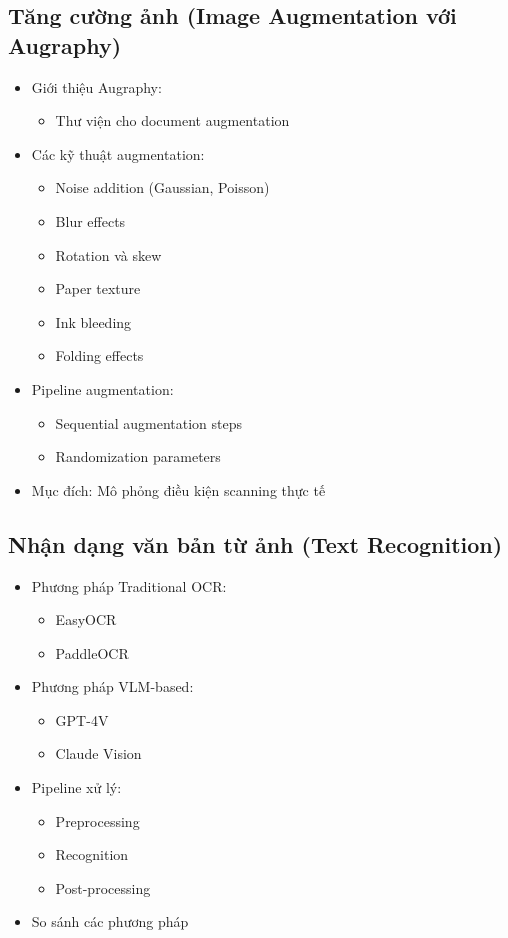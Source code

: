 \subsection{Tăng cường ảnh (Image Augmentation với Augraphy)}
\begin{itemize}
    \item Giới thiệu Augraphy:
    \begin{itemize}
        \item Thư viện cho document augmentation
    \end{itemize}
    \item Các kỹ thuật augmentation:
    \begin{itemize}
        \item Noise addition (Gaussian, Poisson)
        \item Blur effects
        \item Rotation và skew
        \item Paper texture
        \item Ink bleeding
        \item Folding effects
    \end{itemize}
    \item Pipeline augmentation:
    \begin{itemize}
        \item Sequential augmentation steps
        \item Randomization parameters
    \end{itemize}
    \item Mục đích: Mô phỏng điều kiện scanning thực tế
\end{itemize}

\subsection{Nhận dạng văn bản từ ảnh (Text Recognition)}
\begin{itemize}
    \item Phương pháp Traditional OCR:
    \begin{itemize}
        \item EasyOCR
        \item PaddleOCR
    \end{itemize}
    \item Phương pháp VLM-based:
    \begin{itemize}
        \item GPT-4V
        \item Claude Vision
    \end{itemize}
    \item Pipeline xử lý:
    \begin{itemize}
        \item Preprocessing
        \item Recognition
        \item Post-processing
    \end{itemize}
    \item So sánh các phương pháp
\end{itemize}

